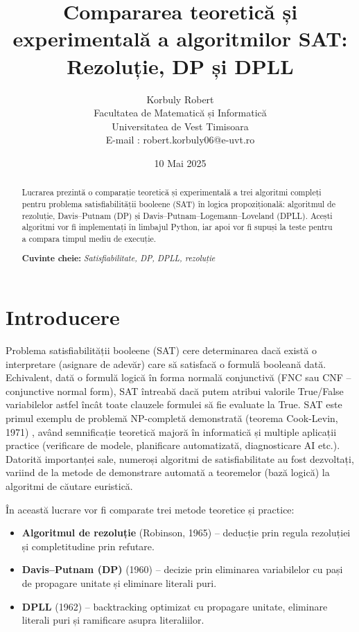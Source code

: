\documentclass[12pt]{article}
\begin{document}
\title{Compararea teoretică și experimentală a algoritmilor SAT: Rezoluție, DP și DPLL}
\author{ Korbuly Robert \\ Facultatea de Matematică și Informatică \\ Universitatea de Vest Timisoara \\ E-mail : robert.korbuly06@e-uvt.ro}
\date{10 Mai 2025}

\maketitle

\begin{abstract}
Lucrarea prezintă o comparație teoretică și experimentală a trei algoritmi compleți pentru problema satisfiabilității booleene (SAT) în logica propozițională: algoritmul de rezoluție, Davis–Putnam (DP) și Davis–Putnam–Logemann–Loveland (DPLL). Acești algoritmi vor fi implementați în limbajul Python, iar apoi vor fi supuși la teste pentru a compara timpul mediu de execuție.

\textbf{Cuvinte cheie:} \textit{Satisfiabilitate, DP, DPLL, rezoluție}
\end{abstract}
\newpage
\tableofcontents
\newpage
\section{Introducere}
Problema satisfiabilității booleene (SAT) cere determinarea dacă există o interpretare (asignare de adevăr) care să satisfacă o formulă booleană dată. Echivalent, dată o formulă logică în forma normală conjunctivă (FNC sau CNF – conjunctive normal form), SAT întreabă dacă putem atribui valorile True/False variabilelor astfel încât toate clauzele formulei să fie evaluate la True. SAT este primul exemplu de problemă NP-completă demonstrată (teorema Cook-Levin, 1971) \cite{handbook}, având semnificație teoretică majoră în informatică și multiple aplicații practice (verificare de modele, planificare automatizată, diagnosticare AI etc.). Datorită importanței sale, numeroși algoritmi de satisfiabilitate au fost dezvoltați, variind de la metode de demonstrare automată a teoremelor (bază logică) la algoritmi de căutare euristică.

În această lucrare vor fi comparate trei metode teoretice și practice:
\begin{itemize}
  \item \textbf{Algoritmul de rezoluție} (Robinson, 1965) – deducție prin regula rezoluției și completitudine prin refutare.
  \item \textbf{Davis–Putnam (DP)} (1960) – decizie prin eliminarea variabilelor cu pași de propagare unitate și eliminare literali puri.
  \item \textbf{DPLL} (1962) – backtracking optimizat cu propagare unitate, eliminare literali puri și ramificare asupra literaliilor.
\end{itemize}
\end{document}
